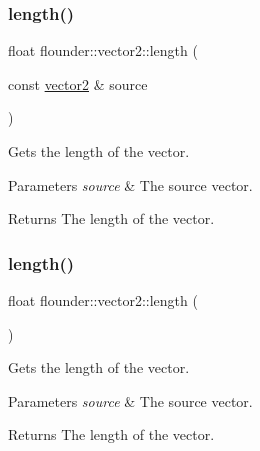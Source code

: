 \subsubsection{\texorpdfstring{length()}{length()}\hspace{0.1cm}{\footnotesize\ttfamily [1/2]}}
{\footnotesize\ttfamily float flounder\+::vector2\+::length (\begin{DoxyParamCaption}\item[{const \hyperlink{classflounder_1_1vector2}{vector2} \&}]{source }\end{DoxyParamCaption})\hspace{0.3cm}{\ttfamily [static]}}



Gets the length of the vector. 


\begin{DoxyParams}{Parameters}
{\em source} & The source vector. \\
\hline
\end{DoxyParams}
\begin{DoxyReturn}{Returns}
The length of the vector. 
\end{DoxyReturn}
\mbox{\label{classflounder_1_1vector2_a0d8e945760ad8ebc6b72ee7865e44cb9}} 
\subsubsection{\texorpdfstring{length()}{length()}\hspace{0.1cm}{\footnotesize\ttfamily [2/2]}}
{\footnotesize\ttfamily float flounder\+::vector2\+::length (\begin{DoxyParamCaption}{ }\end{DoxyParamCaption})}



Gets the length of the vector. 


\begin{DoxyParams}{Parameters}
{\em source} & The source vector. \\
\hline
\end{DoxyParams}
\begin{DoxyReturn}{Returns}
The length of the vector. 
\end{DoxyReturn}
\mbox{\label{classflounder_1_1vector2_a3cb46839794e2b997814a5a84ffcbde6}} 
